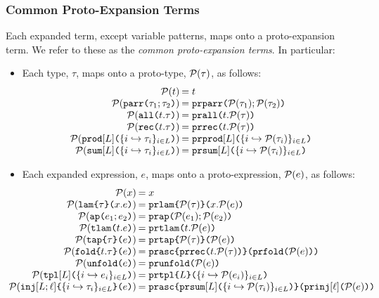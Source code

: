 \subsubsection{Common Proto-Expansion Terms}
Each expanded term, except variable patterns, maps onto a proto-expansion term. We refer to these as the \emph{common proto-expansion terms}. In particular:
\begin{itemize}
  \item Each type, $\tau$, maps onto a proto-type, $\mathcal{P}(\tau)$, as follows:
  \[\arraycolsep=1pt\begin{array}{rl}
  \Cof{t} & = t\\
  \Cof{\aparr{\tau_1}{\tau_2}} & = \aceparr{\Cof{\tau_1}}{\Cof{\tau_2}}\\
  \Cof{\aall{t}{\tau}} & = \aceall{t}{\Cof{\tau}}\\
  \Cof{\arec{t}{\tau}} & = \acerec{t}{\Cof{\tau}}\\
  \Cof{\aprod{\labelset}{\mapschema{\tau}{i}{\labelset}}} & = \aceprod{\labelset}{\mapschemax{\Cofv}{\tau}{i}{\labelset}}\\
  \Cof{\asum{\labelset}{\mapschema{\tau}{i}{\labelset}}} & = \acesum{\labelset}{\mapschemax{\Cofv}{\tau}{i}{\labelset}}
  \end{array}\]
  \item Each expanded expression, $e$, maps onto a proto-expression, $\mathcal{P}(e)$, as follows:
  \[\arraycolsep=1pt\hspace{-15px}\begin{array}{rl}
  \Cof{x} & = x\\
  \Cof{\aelam{\tau}{x}{e}} & = \acelam{\Cof{\tau}}{x}{\Cof{e}}\\
  \Cof{\aeap{e_1}{e_2}} & = \aceap{\Cof{e_1}}{\Cof{e_2}}\\
  \Cof{\aetlam{t}{e}} & = \acetlam{t}{\Cof{e}}\\
  \Cof{\aetap{e}{\tau}} & = \acetap{\Cof{e}}{\Cof{\tau}}\\
  \Cof{\aefold{t}{\tau}{e}} & = \aceasc{\acerec{t}{\Cof{\tau}}}{\acefold{\Cof e}}\\
  \Cof{\aeunfold{e}} & = \aceunfold{\Cof{e}}\\
  \Cof{\aetpl{\labelset}{\mapschema{e}{i}{\labelset}}} & = \acetpl{\labelset}{\mapschemax{\Cofv}{e}{i}{\labelset}}\\
  \Cof{\aein{\labelset}{\ell}{\mapschema{\tau}{i}{\labelset}}{e}} &= \aceasc
    {
      \acesum{\labelset}{\mapschemax{\Cofv}{\tau}{i}{\labelset}}
    }{\acein{\ell}{\Cof{e}}}\\

\end{array}\]
\end{itemize}
